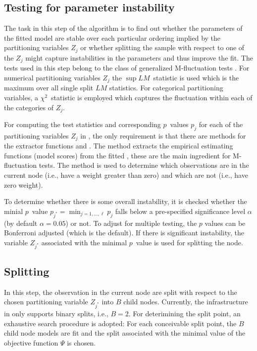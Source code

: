 \documentclass{Z}
\begin{document}
\subsection{Testing for parameter instability}

The task in this step of the algorithm is to find out whether the parameters
of the fitted model are stable over each particular ordering implied by
the partitioning variables $Z_j$ or whether splitting the sample with respect
to one of the $Z_j$ might capture instabilities in the parameters and thus improve the fit.
The tests used in this step belong to the class of generalized M-fluctuation
tests \citep{ZeileisHornik2003,Zeileis2005}. For numerical partitioning variables
$Z_j$ the $\sup LM$~statistic is used which is the maximum over all single split
$LM$ statistics. For categorical partitioning variables, a $\chi^2$~statistic is
employed which captures the fluctuation within each of the categories of $Z_j$.

For computing the test statistics and corresponding $p$~values $p_j$ for 
each of the partitioning variables $Z_j$ in , the only requirement
is that there are methods for the extractor functions  and 
. The  method extracts the empirical estimating
functions (model scores) from the fitted , these are the 
main ingredient for M-fluctuation tests. The  method is used
to determine which observations are in the current node (i.e., have a weight
greater than zero) and which are not (i.e., have zero weight).

To determine whether there is some overall instability, it is checked whether
the minial $p$~value $p_{j^*} = \min_{j = 1, \dots, \ell} p_j$ falls below a
pre-specified significance level $\alpha$ (by default $\alpha = 0.05$) or not.
To adjust for multiple testing, the $p$ values can be Bonferroni adjusted
(which is the default). If there is significant instability, the variable $Z_{j^*}$
associated with the minimal $p$~value is used for splitting the node.

\subsection{Splitting}

In this step, the observation in the current node are split with respect
to the chosen partitioning variable $Z_{j^*}$ into $B$ child nodes. Currently,
the infrastructure in  only supports binary splits, i.e., $B = 2$.
For deterimining the split point, an exhaustive search procedure is adopted:
For each conceivable split point, the $B$ child node models are fit and the split
associated with the minimal value of the objective function $\Psi$ is chosen.
\end{document}
